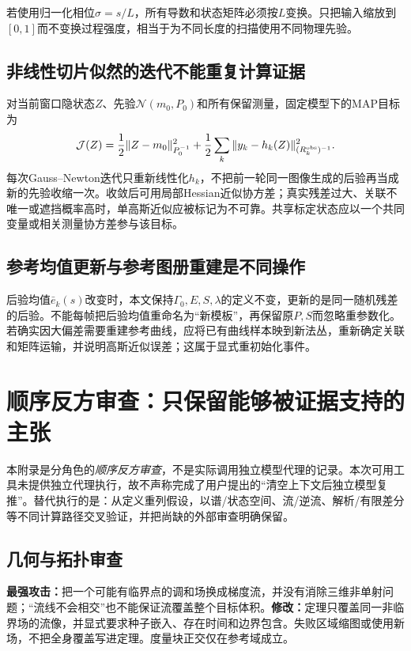 \documentclass[UTF8,11pt,a4paper,fontset=fandol]{ctexart}
\numberwithin{equation}{section}
\theoremstyle{plain}
\theoremstyle{definition}
\theoremstyle{remark}
\newcommand{\Normal}{\mathcal N}\newcommand{\dd}{\mathrm d}
\begin{document}
若使用归一化相位$\sigma=s/L$，所有导数和状态矩阵必须按$L$变换。只把输入缩放到$[0,1]$而不变换过程强度，相当于为不同长度的扫描使用不同物理先验。

\subsection{非线性切片似然的迭代不能重复计算证据}
对当前窗口隐状态$Z$、先验$\Normal(m_0,P_0)$和所有保留测量，固定模型下的MAP目标为
\begin{equation}
 \mathcal J(Z)=\frac12\|Z-m_0\|_{P_0^{-1}}^2+
 \frac12\sum_k\|y_k-h_k(Z)\|_{(R_k^{\rm obs})^{-1}}^2.
 \label{eq:fixed-prior-map}
\end{equation}
每次Gauss--Newton迭代只重新线性化$h_k$，不把前一轮同一图像生成的后验再当成新的先验收缩一次。收敛后可用局部Hessian近似协方差；真实残差过大、关联不唯一或遮挡概率高时，单高斯近似应被标记为不可靠。共享标定状态应以一个共同变量或相关测量协方差参与该目标。

\subsection{参考均值更新与参考图册重建是不同操作}
后验均值$\bar e_k(s)$改变时，本文保持$\Gamma_0,E,S,\lambda$的定义不变，更新的是同一随机残差的后验。不能每帧把后验均值重命名为“新模板”，再保留原$P,S$而忽略重参数化。若确实因大偏差需要重建参考曲线，应将已有曲线样本映到新法丛，重新确定关联和矩阵运输，并说明高斯近似误差；这属于显式重初始化事件。

\section{顺序反方审查：只保留能够被证据支持的主张}\label{app:review}
本附录是分角色的\emph{顺序反方审查}，不是实际调用独立模型代理的记录。本次可用工具未提供独立代理执行，故不声称完成了用户提出的“清空上下文后独立模型复推”。替代执行的是：从定义重列假设，以谱/状态空间、流/逆流、解析/有限差分等不同计算路径交叉验证，并把尚缺的外部审查明确保留。

\subsection{几何与拓扑审查}
\textbf{最强攻击：}把一个可能有临界点的调和场换成梯度流，并没有消除三维非单射问题；“流线不会相交”也不能保证流覆盖整个目标体积。\textbf{修改：}定理只覆盖同一非临界场的流像，并显式要求种子嵌入、存在时间和边界包含。失败区域缩图或使用新场，不把全身覆盖写进定理。度量块正交仅在参考域成立。
\end{document}
